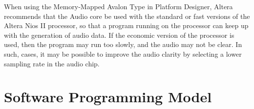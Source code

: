 \documentclass[11pt, twoside, pdftex]{article}
\begin{document}
{\leftpointright}
When using the Memory-Mapped \textsf{Avalon Type} in Platform Designer, Altera recommends that the 
Audio core be used with the standard or fast 
versions of the Altera Nios II processor, so that a program 
running on the processor can keep up with the generation of audio data. If the 
economic version of the processor is used, then the 
program may run too slowly, and the audio may not be clear. In such, cases,
it may be possible to improve the audio clarity by selecting a 
lower sampling rate in the audio chip.


\section{Software Programming Model}



\end{document}
